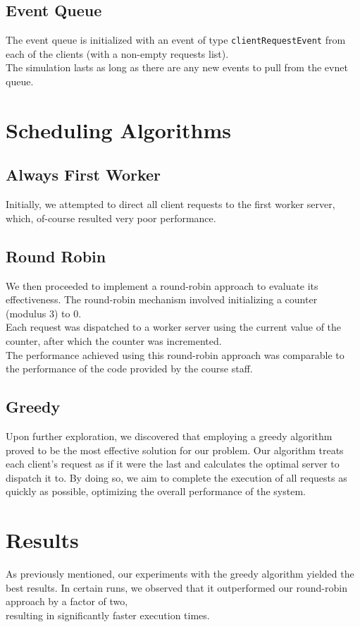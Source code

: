 \documentclass{article}
\begin{document}
\subsection{Event Queue}
The event queue is initialized with an event of type \texttt{clientRequestEvent}
from each of the clients (with a non-empty requests list).\\
The simulation lasts as long as there are any new events to pull from the evnet queue.

\section{Scheduling Algorithms}
\subsection{Always First Worker}
Initially, we attempted to direct all client requests to the first worker server, which, of-course resulted very poor performance.

\subsection{Round Robin}
We then proceeded to implement a round-robin approach to evaluate its effectiveness.
The round-robin mechanism involved initializing a counter (modulus 3) to 0.\\
Each request was dispatched to a worker server using the current value of the counter, after which the counter was incremented.\\
The performance achieved using this round-robin approach was comparable to the performance of the code provided by the course staff.

\subsection{Greedy}
Upon further exploration, we discovered that employing a greedy algorithm proved to be the most effective solution for our problem.
Our algorithm treats each client's request as if it were the last and calculates the optimal server to dispatch it to.
By doing so, we aim to complete the execution of all requests as quickly as possible, optimizing the overall performance of the system.

\section{Results}
As previously mentioned, our experiments with the greedy algorithm yielded the best results.
In certain runs, we observed that it outperformed our round-robin approach by a factor of two,\\
resulting in significantly faster execution times.
\end{document}
